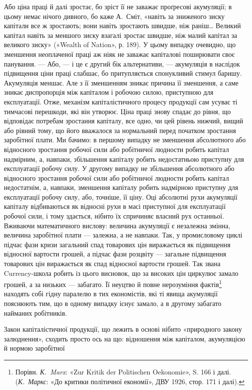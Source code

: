 Або ціна праці й далі зростає, бо зріст її не заважає проґресові
акумуляції; в цьому немає нічого дивного, бо каже А.~Сміт,
«навіть за зниженого зиску капітали все ж зростають; вони навіть
зростають швидше, ніж раніш\dots{} Великий капітал навіть
за меншого зиску взагалі зростає швидше, ніж малий капітал за
великого зиску» («Wealth of Nation», р. 189). У цьому випадку
очевидно, що зменшення неоплаченої праці аж ніяк не заважає
капіталові поширювати своє панування. — Або, — і це є другий
бік альтернативи, — акумуляція в наслідок підвищення ціни
праці слабшає, бо притупляється спонукливий стимул баришу.
Акумуляція меншає. Але з її зменшенням зникає причина її
зменшення, а саме зникає диспропорція між капіталом і робочою
силою, приступною для експлуатації. Отже, механізм капіталістичного
процесу продукції сам усуває ті тимчасові перешкоди,
які він утворює. Ціна праці знову спадає до рівня, що
відповідає потребам зростання капіталу, все одно, чи цей рівень
нижчий, вищий або рівний тому, що його вважалося за нормальний
перед початком зростання заробітної плати. Ми бачимо:
в першому випадку не зменшення абсолютного або відносного
зростання робочої сили або робітничої людности робить капітал
надмірним, а, навпаки, збільшення капіталу робить недостатньою
приступну для експлуатації робочу силу. У другому випадку
не збільшення абсолютного або відносного зростання робочої
сили або робітничої людности робить капітал недостатнім, а,
навпаки, зменшення капіталу робить надмірною приступну для
експлуатації робочу силу, або, точніше, її ціну. Оці абсолютні
рухи акумуляції капіталу відбиваються як відносні рухи в масі
приступної для експлуатації робочої сили, і тому здається, нібито
їх спричиняє власний рух останньої. Вживаючи математичного
вислову: величина акумуляції є незалежна змінна, величина
заробітної плати — залежна, а не навпаки. Так, у промисловому
циклі підчас фази кризи загальний спад товарових цін виражається
як підвищення відносної вартости грошей, а підчас фази
розцвіту — загальне підвищення товарових цін виражається як
спад відносної вартости грошей. Так звана Currency-школа
робить із цього висновок, що за високих цін циркулює замало
грошей, а за низьких — забагато. Її неуцтво й повне нерозуміння
фактів\footnote{
Порівн. \emph{К.~Marx}: «Zur Kritik der Politischen Oekonomie»,
S. 166 і далі. (\emph{К.~Маркс}: «До критики політичної економії», ДВУ 1926,
стор. 171 і далі).
} находять собі гідну паралелю в тих економістів,
які ті явища акумуляції пояснюють тим, що в одному випадку
існує замало, а в другому забагато найманих робітників.

Закон капіталістичної продукції, що лежить в основі нібито
«природного закону залюднення», сходить просто ось на що:
відношення між капіталом, акумуляцією й нормою заробітної
\parbreak{}  %
